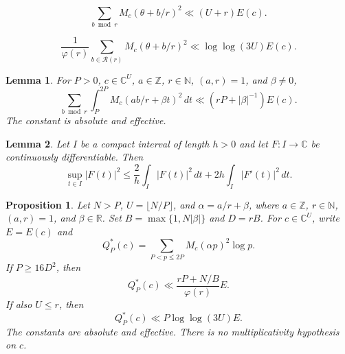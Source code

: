 \documentclass[10pt,a4paper]{amsart}
\newtheorem{proposition}{Proposition}
\newtheorem{lemma}{Lemma}
\newcommand{\C}{\mathbb{C}}
\newcommand{\N}{\mathbb{N}}
\newcommand{\R}{\mathbb{R}}
\newcommand{\Z}{\mathbb{Z}}
\begin{document}
\begin{equation}\label{eq:maximal-all-residues}
 \sum_{b\bmod r}M_c(\theta+b/r)^2\ll (U+r)E(c).
\end{equation}

\begin{equation}\label{eq:maximal-reduced-residues}
 \frac1{\varphi(r)}\sum_{b\in\mathcal R(r)}M_c(\theta+b/r)^2
 \ll\log\log(3U)E(c).
\end{equation}

\begin{lemma}\label{lem:covering}
For $P>0$, $c\in\C^U$, $a\in\Z$, $r\in\N$, $(a,r)=1$, and
$\beta\ne0$,
\begin{equation}\label{eq:covering}
 \sum_{b\bmod r}\int_P^{2P}M_c(ab/r+\beta t)^2\,dt
 \ll (rP+|\beta|^{-1})E(c).
\end{equation}
The constant is absolute and effective.
\end{lemma}

\begin{lemma}\label{lem:variation}
Let $I$ be a compact interval of length $h>0$ and let $F:I\to\C$
be continuously differentiable. Then
\begin{equation}\label{eq:interval-variation}
 \sup_{t\in I}|F(t)|^2
 \le\frac2h\int_I|F(t)|^2\,dt
       +2h\int_I|F'(t)|^2\,dt.
\end{equation}
\end{lemma}

\begin{proposition}\label{prop:effective-maximal-prime}
Let $N>P$, $U=\lfloor N/P\rfloor$, and
$\alpha=a/r+\beta$, where $a\in\Z$, $r\in\N$, $(a,r)=1$, and
$\beta\in\R$. Set $B=\max\{1,N|\beta|\}$ and $D=rB$.
For $c\in\C^U$, write $E=E(c)$ and
\begin{equation}\label{eq:Qstar-def}
 Q_P^*(c)=\sum_{P<p\le2P}M_c(\alpha p)^2\log p.
\end{equation}
If $P\ge16D^2$, then
\begin{equation}\label{eq:effective-prime-general}
 Q_P^*(c)\ll\frac{rP+N/B}{\varphi(r)}E.
\end{equation}
If also $U\le r$, then
\begin{equation}\label{eq:effective-prime-short}
 Q_P^*(c)\ll P\log\log(3U)E.
\end{equation}
The constants are absolute and effective. There is no multiplicativity
hypothesis on $c$.
\end{proposition}
\end{document}

